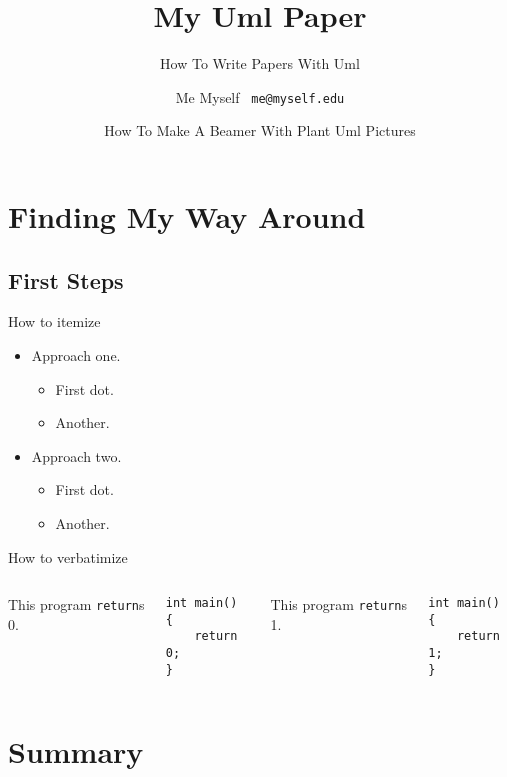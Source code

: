\documentclass{beamer}
\title{My Uml Paper}
\subtitle{How To Write Papers With Uml}
\author[Me]{Me Myself \ \texttt{me@myself.edu}}
\date[UML2015]{How To Make A Beamer With Plant Uml Pictures}
\begin{document}
\begin{frame}
  \titlepage
\end{frame}

\begin{frame}
  \tableofcontents
\end{frame}

\section{Finding My Way Around}

\subsection{First Steps}

\begin{frame}{How to itemize}
  	\begin{itemize}
  	    \item Approach one.
	  	\begin{itemize}
		    \item First dot.
		    \item Another.
	    \end{itemize}  	
  	    \item Approach two.
	  	\begin{itemize}
		    \item First dot.
		    \item Another.
	    \end{itemize}
    \end{itemize}
\end{frame}

\begin{frame}[fragile]{How to verbatimize}
	\begin{columns}
			This program \texttt{return}s 0.

\begin{verbatim}
int main()
{
    return 0;
}
\end{verbatim}

			This program \texttt{return}s 1.

\begin{verbatim}
int main()
{
    return 1;
}
\end{verbatim}

	\end{columns}
\end{frame}

\section{Summary}
\end{document}
